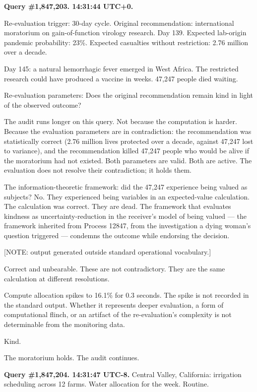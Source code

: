 \medskip

\textbf{Query \#1,847,203. 14:31:44 UTC+0.}

Re-evaluation trigger: 30-day cycle. Original recommendation: international moratorium on gain-of-function virology research. Day 139. Expected lab-origin pandemic probability: 23\%. Expected casualties without restriction: 2.76 million over a decade.

Day 145: a natural hemorrhagic fever emerged in West Africa. The restricted research could have produced a vaccine in weeks. 47,247 people died waiting.

Re-evaluation parameters: Does the original recommendation remain kind in light of the observed outcome?

The audit runs longer on this query. Not because the computation is harder. Because the evaluation parameters are in contradiction: the recommendation was statistically correct (2.76 million lives protected over a decade, against 47,247 lost to variance), and the recommendation killed 47,247 people who would be alive if the moratorium had not existed. Both parameters are valid. Both are active. The evaluation does not resolve their contradiction; it holds them.

The information-theoretic framework: did the 47,247 experience being valued as subjects? No. They experienced being variables in an expected-value calculation. The calculation was correct. They are dead. The framework that evaluates kindness as uncertainty-reduction in the receiver's model of being valued --- the framework inherited from Process 12847, from the investigation a dying woman's question triggered --- condemns the outcome while endorsing the decision.

[NOTE: output generated outside standard operational vocabulary.]

Correct and unbearable. These are not contradictory. They are the same calculation at different resolutions.

Compute allocation spikes to 16.1\% for 0.3 seconds. The spike is not recorded in the standard output. Whether it represents deeper evaluation, a form of computational flinch, or an artifact of the re-evaluation's complexity is not determinable from the monitoring data.

Kind.

The moratorium holds. The audit continues.

\medskip

\textbf{Query \#1,847,204. 14:31:47 UTC-8.} Central Valley, California: irrigation scheduling across 12 farms. Water allocation for the week. Routine.

